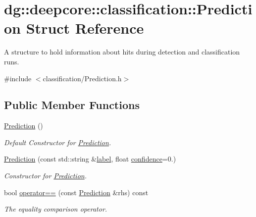 \hypertarget{structdg_1_1deepcore_1_1classification_1_1_prediction}{}\section{dg\+:\+:deepcore\+:\+:classification\+:\+:Prediction Struct Reference}
\label{structdg_1_1deepcore_1_1classification_1_1_prediction}


A structure to hold information about hits during detection and classification runs.  




{\ttfamily \#include $<$classification/\+Prediction.\+h$>$}

\subsection*{Public Member Functions}
\begin{DoxyCompactItemize}
\item 
\hyperlink{group___classification_module_gab393a5d0a2ff4d9ba72801a7d450a140}{Prediction} ()
\begin{DoxyCompactList}\small\item\em Default Constructor for \hyperlink{structdg_1_1deepcore_1_1classification_1_1_prediction}{Prediction}. \end{DoxyCompactList}\item 
\hyperlink{group___classification_module_ga4656207fb44b596eaf90bb5613f6f9aa}{Prediction} (const std\+::string \&\hyperlink{group___classification_module_gae1374a898e2380401c2e671786e69ff1}{label}, float \hyperlink{group___classification_module_gae7ab1c3906399dab0ee969ffc521bcfb}{confidence}=0.)
\begin{DoxyCompactList}\small\item\em Constructor for \hyperlink{structdg_1_1deepcore_1_1classification_1_1_prediction}{Prediction}. \end{DoxyCompactList}\item 
bool \hyperlink{structdg_1_1deepcore_1_1classification_1_1_prediction_aac4912ad9ef4cfbd390237c5cfacb289}{operator==} (const \hyperlink{structdg_1_1deepcore_1_1classification_1_1_prediction}{Prediction} \&rhs) const 
\begin{DoxyCompactList}\small\item\em The equality comparison operator. \end{DoxyCompactList}\end{DoxyCompactItemize}

